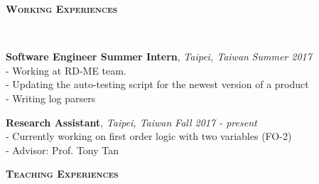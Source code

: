 \documentclass[10pt]{article}
\newenvironment{changemargin}[2]{%
  \begin{list}{}{%
    \setlength{\topsep}{0pt}%
    \setlength{\leftmargin}{#1}%
    \setlength{\rightmargin}{#2}%
    \setlength{\listparindent}{\parindent}%
    \setlength{\itemindent}{\parindent}%
    \setlength{\parsep}{\parskip}%
  }%
  \item[]}{\end{list}
}
\newcommand{\lineover}{
	\begin{changemargin}{-0.05in}{-0.05in}
		\vspace*{-8pt}
		\hrulefill \\
		\vspace*{-2pt}
	\end{changemargin}
}
\newcommand{\header}[1]{
	\begin{changemargin}{-0.5in}{-0.5in}
		\large{\bf \scshape{#1}}\\
  	\lineover
	\end{changemargin}
}
\newenvironment{body} {
	\vspace*{-16pt}
	\begin{changemargin}{-0.25in}{-0.5in}
  }	
	{\end{changemargin}
}
\begin{document}
\smallskip

\header{Working Experiences}

\begin{body}
	\vspace{14pt}

	\textbf {Software Engineer Summer Intern}, \emph{Taipei, Taiwan} \hfill \emph{Summer 2017}\\
	\hspace{12pt} - Working at RD-ME team.\\
	\hspace{12pt} - Updating the auto-testing script for the newest version of a product\\
	\hspace{12pt} - Writing log parsers
	\smallskip
	
	\textbf {Research Assistant}, \emph{Taipei, Taiwan} \hfill \emph{Fall 2017 - present}\\
	\hspace{12pt} - Currently working on first order logic with two variables (FO-2)\\
	\hspace{12pt} - Advisor: Prof. Tony Tan
	\smallskip
	
\end{body}

\smallskip

\header{Teaching Experiences}
\end{document}

